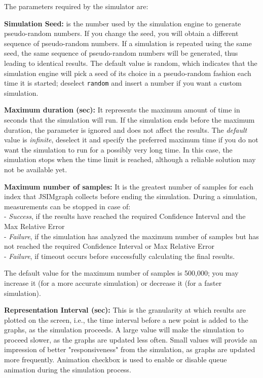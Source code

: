 The parameters required by the simulator are:
\begin{itemize*}
\item \textbf{Simulation Seed:} is the number used by the
simulation engine to generate pseudo-random numbers. If you change
the seed, you will obtain a different sequence of pseudo-random
numbers. If a simulation is repeated using the same seed, the same
sequence of pseudo-random numbers will be generated, thus leading
to identical results. The default value is random, which indicates
that the simulation engine will pick a seed of its choice in a
pseudo-random fashion each time it is started; deselect
\texttt{random} and insert a number if you want a custom
simulation.

\item \textbf{Maximum duration (sec):} It represents the maximum
amount of time in seconds that the simulation will run. If the
simulation ends before the maximum duration, the parameter is
ignored and does not affect the results. The \emph{default} value
is \emph{infinite}, deselect it and specify the preferred maximum
time if you do not want the simulation to run for a possibly very
long time. In this case, the simulation stops when the time limit
is reached, although a reliable solution may not be available yet.

\item \textbf{Maximum number of samples:} It is the greatest
number of samples for each index that JSIMgraph collects before
ending the simulation. During a simulation, measurements can be
stopped in case of:\\
- \emph{Success}, if the results have reached the required
Confidence
Interval and the Max Relative Error\\
- \emph{Failure}, if the simulation has analyzed the maximum
number of samples but has not reached the required Confidence
Interval or
Max Relative Error\\
- \emph{Failure}, if timeout occurs before successfully
calculating the final results.

The default value for the maximum number of samples is 500,000;
 you may increase it (for a more accurate simulation) or decrease
it (for a faster simulation).

\item \textbf{Representation Interval (sec):} This is the
granularity at which results are plotted on the screen, i.e., the
time interval before a new point is added to the graphs, as the
simulation proceeds. A large value will make the simulation to
proceed slower, as the graphs are updated less often. Small values
will provide an impression of better "responsiveness" from the
simulation, as graphs are updated more frequently. Animation
checkbox is used to enable or disable queue animation during the
simulation process. \end{itemize*}

